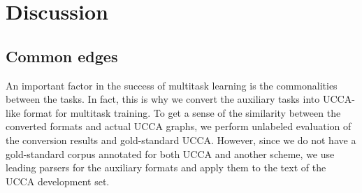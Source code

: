 \documentclass[11pt,a4paper]{article}
\begin{document}
\section{Discussion}\label{sec:discussion}

\subsection{Common edges}\label{sec:common}

An important factor in the success of multitask learning is the commonalities between the tasks.
In fact, this is why we convert the auxiliary tasks into UCCA-like format for multitask training.
To get a sense of the similarity between the converted formats and actual UCCA graphs,
we perform unlabeled evaluation of the conversion results and gold-standard UCCA.
However, since we do not have a gold-standard corpus annotated for both UCCA and another scheme,
we use leading parsers for the auxiliary formats and apply them to the text of the
UCCA development set.





\end{document}
